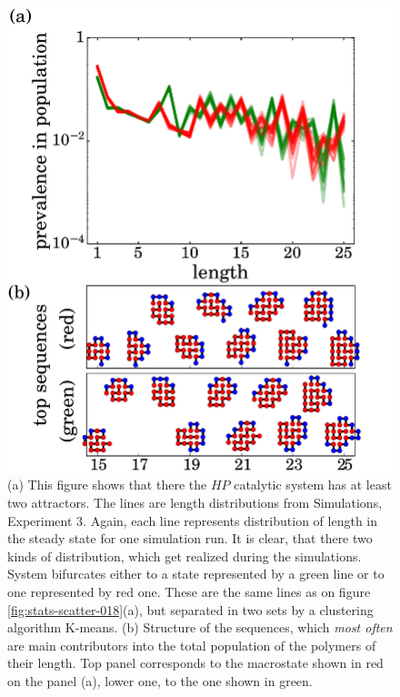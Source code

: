 \documentclass[5p,times]{elsarticle}
\begin{document}
\begin{figure}[h!]
  \centering
  \includegraphics[width=0.9\columnwidth]{pictures/distr1837-dynamics.pdf}
  \caption{\footnotesize{\textbf{} (a) This figure shows that there the $HP$ catalytic system has 
at least two attractors. The lines are length distributions from Simulations, Experiment 3. Again, 
each line represents distribution of length in the steady state for one simulation run. It is 
clear, that there two kinds of distribution, which get realized during the simulations. System 
bifurcates either to a state represented by a green line or to one represented by red one. These 
are the same lines as on figure \ref{fig:stats-scatter-018}(a), but separated in two sets by a 
clustering algorithm K-means. (b) Structure of the sequences, which \textit{most often} 
are main contributors into the total population of the polymers of their length. Top panel 
corresponds to the macrostate shown in red on the panel (a), lower one, to the one shown in green. 
}}
  \label{fig:distr1837-dyn}
\end{figure}
\end{document}
